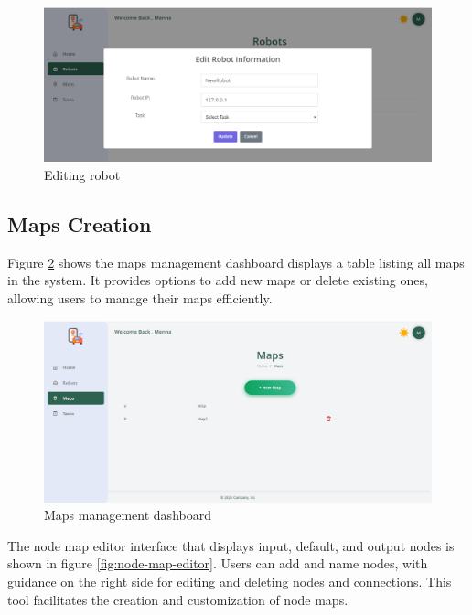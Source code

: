     \begin{figure}[h!]
        \centering
        \includegraphics[scale=0.4]{./Figures/WebApp/editRobot.png}
        \caption{Editing robot}
        \label{fig:edit-robot}
    \end{figure}

\vspace{-3mm}
\newpage
\subsection{Maps Creation}

    Figure \ref{fig:maps-management} shows the maps management dashboard displays a table listing all maps in the system. It provides options to add new maps or delete existing ones, allowing users to manage their maps efficiently.

    \begin{figure}[h!]
        \centering
        \includegraphics[scale=0.4]{./Figures/WebApp/mapsCreation.png}
        \caption{Maps management dashboard}
        \label{fig:maps-management}
    \end{figure}




    The node map editor interface that displays input, default, and output nodes is shown in figure \ref{fig:node-map-editor}. Users can add and name nodes, with guidance on the right side for editing and deleting nodes and connections. This tool facilitates the creation and customization of node maps.

